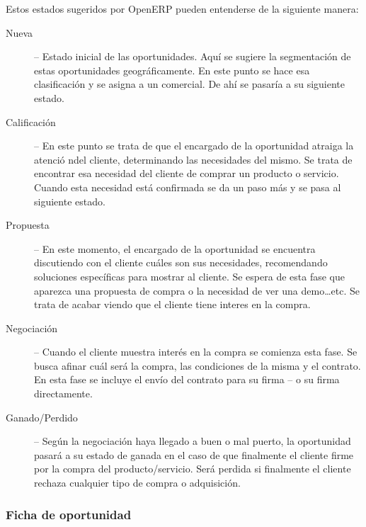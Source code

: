 Estos estados sugeridos por OpenERP pueden entenderse de la siguiente manera:

\begin{description}
   \item[Nueva] -- Estado inicial de las oportunidades. Aquí se sugiere la segmentación de estas oportunidades geográficamente. En este
                punto se hace esa clasificación y se asigna a un comercial. De ahí se pasaría a su siguiente estado.
   \item[Calificación] -- En este punto se trata de que el encargado de la oportunidad atraiga la atenció ndel cliente, determinando 
                las necesidades del mismo. Se trata de encontrar esa necesidad del cliente de comprar un producto o servicio. 
                Cuando esta necesidad está confirmada se da un paso más y se pasa al siguiente estado.
   \item[Propuesta] -- En este momento, el encargado de la oportunidad se encuentra discutiendo con el cliente cuáles son sus necesidades,
                recomendando soluciones específicas para mostrar al cliente. Se espera de esta fase que aparezca una propuesta de compra
                o la necesidad de ver una demo\ldots etc. Se trata de acabar viendo que el cliente tiene interes en la compra.
   \item[Negociación] -- Cuando el cliente muestra interés en la compra se comienza esta fase. Se busca afinar cuál será la compra, las
                condiciones de la misma y el contrato. En esta fase se incluye el envío del contrato para su firma -- o su firma      
                directamente.
   \item[Ganado/Perdido] -- Según la negociación haya llegado a buen o mal puerto, la oportunidad pasará a su estado de ganada
                en el caso de que finalmente el cliente firme por la compra del producto/servicio. Será perdida si finalmente el cliente
                rechaza cualquier tipo de compra o adquisición.
\end{description}

\vspace{2cm}
\subsubsection{Ficha de oportunidad}

